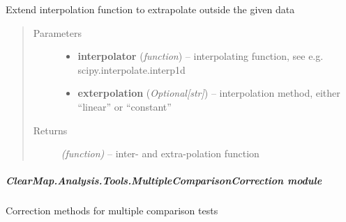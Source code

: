 \documentclass[letterpaper,10pt,english]{sphinxmanual}
\begin{document}
\begin{fulllineitems}
\label{api/ClearMap.Analysis.Tools:ClearMap.Analysis.Tools.Extrapolate.extrap1dFromInterp1d}
Extend interpolation function to extrapolate outside the given data
\begin{quote}\begin{description}
\item[{Parameters}] \leavevmode\begin{itemize}
\item {} 
\textbf{interpolator} (\emph{function}) --
interpolating function, see e.g. scipy.interpolate.interp1d

\item {} 
\textbf{exterpolation} (\emph{Optional{[}str{]}}) --
interpolation method, either ``linear'' or ``constant''

\end{itemize}

\item[{Returns}] \leavevmode
\emph{(function)} --
inter- and extra-polation function

\end{description}\end{quote}

\end{fulllineitems}



\subparagraph{ClearMap.Analysis.Tools.MultipleComparisonCorrection module}
\label{api/ClearMap.Analysis.Tools:clearmap-analysis-tools-multiplecomparisoncorrection-module}\label{api/ClearMap.Analysis.Tools:module-ClearMap.Analysis.Tools.MultipleComparisonCorrection}
Correction methods for multiple comparison tests
\end{document}
